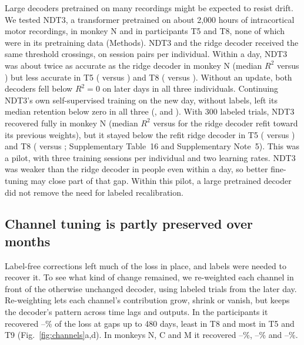 \documentclass[pdflatex,sn-nature]{sn-jnl}
\begin{document}
Large decoders pretrained on many recordings might be expected to resist
drift\cite{ye2023ndt2,azabou2023poyo,ryoo2025possm}. We tested NDT3\cite{ye2025ndt3}, a
transformer pretrained on about 2,000 hours of intracortical motor recordings, in monkey N and in participants T5 and T8, none of
which were in its pretraining data (Methods). NDT3 and the ridge decoder received the same threshold crossings, on
 session pairs per individual. Within a day, NDT3 was about twice as accurate as the ridge decoder in
monkey N (median $R^2$  versus ) but less accurate in T5 (
versus ) and T8 ( versus ). Without an update, both decoders
fell below $R^2 = 0$ on later days in all three individuals. Continuing NDT3's own self-supervised training on the new day,
without labels, left its median retention below zero in all three (,  and
). With 300 labeled trials, NDT3 recovered fully in monkey N (median $R^2$ 
versus  for the ridge decoder refit toward its previous weights), but it stayed below the refit ridge
decoder in T5 ( versus ) and T8 ( versus
; Supplementary Table~16 and Supplementary Note~5). This was a pilot, with three training sessions
per individual and two learning rates. NDT3 was weaker than the ridge decoder in people even within a day, so better
fine-tuning may close part of that gap. Within this pilot, a large pretrained decoder did not remove the need for
labeled recalibration.

\subsection*{Channel tuning is partly preserved over months}

Label-free corrections left much of the loss in place, and labels were needed to recover it. To see what kind of
change remained, we re-weighted each
channel in front of the otherwise unchanged decoder, using labeled trials from the later day. Re-weighting lets each
channel's contribution grow, shrink or vanish, but keeps the decoder's pattern across time lags and outputs. In the
participants it recovered --\% of the loss at gaps up to 480 days, least in T8 and
most in T5 and T9 (Fig.~\ref{fig:channels}a,d). In monkeys N, C and M it recovered
--\%, --\% and --\%.
\end{document}
